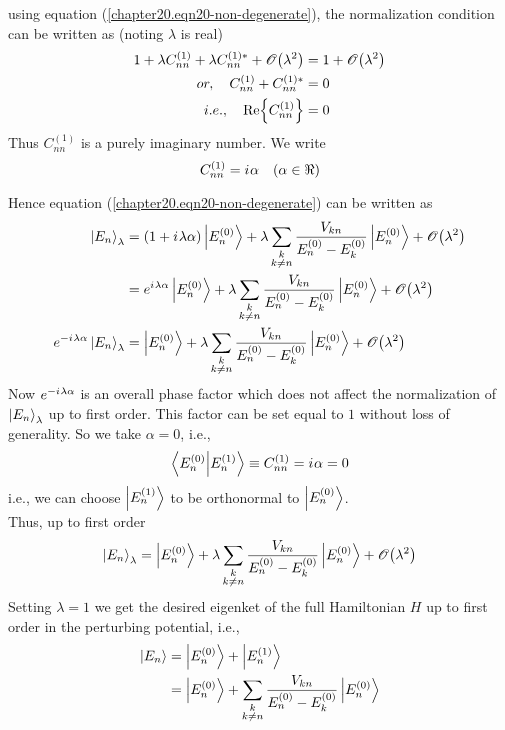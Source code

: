 	using equation (\ref{chapter20.eqn20-non-degenerate}), the normalization condition can be written as (noting $\lambda$ is real)
	\begin{align}
		1 + \lambda C^{(1)}_{n n} + \lambda C^{(1)*}_{n n} + \order{\lambda^2}
		&= 1 + \order{\lambda^2} \\
		or, \quad C^{(1)}_{n n} +  C^{(1)*}_{n n} &= 0  \\
	i.e., \quad		\Re{C^{(1)}_{n n}} &= 0
	\end{align}
	Thus $C^{(1)}_{n n}$ is a purely imaginary number. We write
	\begin{equation}
		C^{(1)}_{n n} = \iu \alpha \quad (\alpha \in \real)
	\end{equation}

	Hence equation (\ref{chapter20.eqn20-non-degenerate}) can be written as
	\begin{align}
		\ket{E_n}_{\lambda} 
		&= \qty(1 + \iu \lambda \alpha) \ket{E_n^{(0)}} + \lambda \sum_{\substack{k \\ k \neq n}} \frac{V_{k n}}{E_n^{(0)} -  E_{k}^{(0)}} \ket{E_n^{(0)}} + \order{\lambda^2} \\
		&= e^{\iu \lambda \alpha} \ket{E_n^{(0)}} + \lambda \sum_{\substack{k \\ k \neq n}} \frac{V_{k n}}{E_n^{(0)} -  E_{k}^{(0)}} \ket{E_n^{(0)}} + \order{\lambda^2} \\
		e^{-\iu \lambda \alpha} \ket{E_n}_{\lambda}  &= \ket{E_n^{(0)}} + \lambda \sum_{\substack{k \\ k \neq n}} \frac{V_{k n}}{E_n^{(0)} -  E_{k}^{(0)}} \ket{E_n^{(0)}} + \order{\lambda^2}
	\end{align}
	Now $e^{-{i\mkern1mu} \lambda \alpha}$ is an overall phase factor which does not affect the normalization of $\ket{E_n}_\lambda$ up to first order. This factor can be set equal to $1$ without loss of generality. So we take $\alpha = 0$, i.e.,
	\begin{equation}
		\braket{E^{(0)}_n}{E^{(1)}_n} \equiv C^{(1)}_{n n} = {i\mkern1mu} \alpha = 0
	\end{equation}
	i.e., we can choose $\ket{E_n^{(1)}}$ to be orthonormal to $\ket{E_n^{(0)}}$.\\
	
	Thus, up to first order
	\begin{equation}
		\ket{E_n}_{\lambda}  = \ket{E_n^{(0)}} + \lambda \sum_{\substack{k \\ k \neq n}} \frac{V_{k n}}{E_n^{(0)} -  E_{k}^{(0)}} \ket{E_n^{(0)}} + \order{\lambda^2}
	\end{equation}
	Setting $\lambda = 1$ we get the desired eigenket of  the full Hamiltonian $H$ up to first order in the perturbing potential, i.e.,
	\begin{align}
		\ket{E_n}  
		&= \ket{E_n^{(0)}} + \ket{E_n^{(1)}} \\
		&= \ket{E_n^{(0)}} +  \sum_{\substack{k \\ k \neq n}} \frac{V_{k n}}{E_n^{(0)} -  E_{k}^{(0)}} \ket{E_n^{(0)}}
		\label{chapter20.eqn21-non-degenerate}
	\end{align}
	
